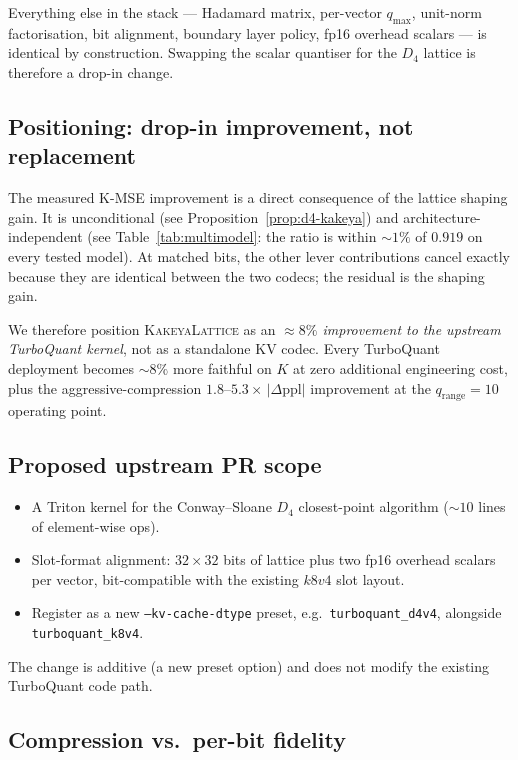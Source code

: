 \documentclass[11pt,a4paper]{article}
\theoremstyle{definition}
\theoremstyle{plain}
\newcommand{\abs}[1]{\left\lvert#1\right\rvert}
\begin{document}
Everything else in the stack --- Hadamard matrix, per-vector
$q_\mathrm{max}$, unit-norm factorisation, bit alignment, boundary
layer policy, fp16 overhead scalars --- is identical by construction.
Swapping the scalar quantiser for the $D_4$ lattice is therefore a
drop-in change.

\subsection{Positioning: drop-in improvement, not replacement}

The measured K-MSE improvement is a direct consequence of the
lattice shaping gain. It is unconditional (see
Proposition~\ref{prop:d4-kakeya}) and architecture-independent (see
Table~\ref{tab:multimodel}: the ratio is within $\sim 1\%$ of $0.919$
on every tested model). At matched bits, the other lever
contributions cancel exactly because they are identical between the
two codecs; the residual is the shaping gain.

We therefore position \textsc{KakeyaLattice} as an
\emph{$\approx 8\%$ improvement to the upstream TurboQuant kernel},
not as a standalone KV codec. Every TurboQuant deployment becomes
$\sim\!8\%$ more faithful on $K$ at zero additional engineering
cost, plus the aggressive-compression
$1.8$--$5.3\times\,\abs{\Delta\mathrm{ppl}}$ improvement at the
$q_\mathrm{range}=10$ operating point.

\subsection{Proposed upstream PR scope}

\begin{itemize}[leftmargin=*]
  \item A Triton kernel for the Conway--Sloane $D_4$ closest-point
    algorithm ($\sim\!10$ lines of element-wise ops).
  \item Slot-format alignment: $32\times 32$ bits of lattice plus
    two fp16 overhead scalars per vector, bit-compatible with the
    existing $k8v4$ slot layout.
  \item Register as a new \texttt{--kv-cache-dtype} preset, e.g.\
    \texttt{turboquant\_d4v4}, alongside \texttt{turboquant\_k8v4}.
\end{itemize}

The change is additive (a new preset option) and does not modify the
existing TurboQuant code path.

\subsection{Compression vs.\ per-bit fidelity}
\end{document}
